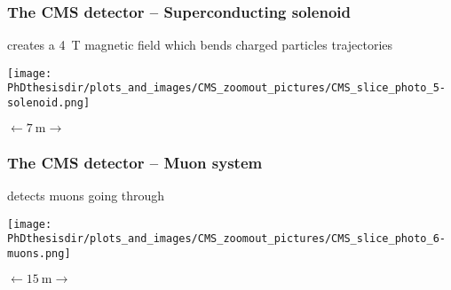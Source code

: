 \begin{frame}\addtocounter{framenumber}{-1}
\frametitle{The CMS detector -- Superconducting solenoid}
\begin{center}
creates a \SI{4}{\tesla} magnetic field which bends charged particles trajectories

\vfill

\texttt{[image: \\PhDthesisdir/plots\_and\_images/CMS\_zoomout\_pictures/CMS\_slice\_photo\_5-solenoid.png]}

\vfill

$\longleftarrow \SI{7}{\meter} \longrightarrow$
\end{center}
\end{frame}
\begin{frame}\addtocounter{framenumber}{-1}
\frametitle{The CMS detector -- Muon system}
\begin{center}
detects muons going through

\vfill

\texttt{[image: \\PhDthesisdir/plots\_and\_images/CMS\_zoomout\_pictures/CMS\_slice\_photo\_6-muons.png]}

\vfill

$\longleftarrow \SI{15}{\meter} \longrightarrow$
\end{center}
\end{frame}